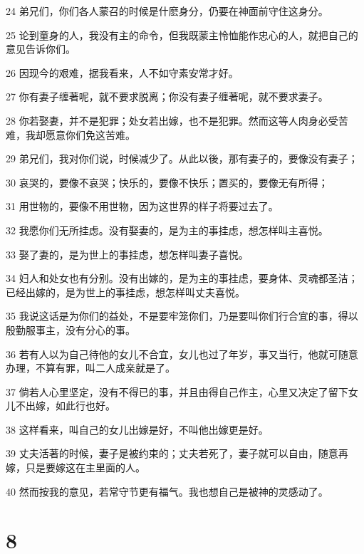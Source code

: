 \par 24 弟兄们，你们各人蒙召的时候是什麽身分，仍要在神面前守住这身分。
\par 25 论到童身的人，我没有主的命令，但我既蒙主怜恤能作忠心的人，就把自己的意见告诉你们。
\par 26 因现今的艰难，据我看来，人不如守素安常才好。
\par 27 你有妻子缠著呢，就不要求脱离；你没有妻子缠著呢，就不要求妻子。
\par 28 你若娶妻，并不是犯罪；处女若出嫁，也不是犯罪。然而这等人肉身必受苦难，我却愿意你们免这苦难。
\par 29 弟兄们，我对你们说，时候减少了。从此以後，那有妻子的，要像没有妻子；
\par 30 哀哭的，要像不哀哭；快乐的，要像不快乐；置买的，要像无有所得；
\par 31 用世物的，要像不用世物，因为这世界的样子将要过去了。
\par 32 我愿你们无所挂虑。没有娶妻的，是为主的事挂虑，想怎样叫主喜悦。
\par 33 娶了妻的，是为世上的事挂虑，想怎样叫妻子喜悦。
\par 34 妇人和处女也有分别。没有出嫁的，是为主的事挂虑，要身体、灵魂都圣洁；已经出嫁的，是为世上的事挂虑，想怎样叫丈夫喜悦。
\par 35 我说这话是为你们的益处，不是要牢笼你们，乃是要叫你们行合宜的事，得以殷勤服事主，没有分心的事。
\par 36 若有人以为自己待他的女儿不合宜，女儿也过了年岁，事又当行，他就可随意办理，不算有罪，叫二人成亲就是了。
\par 37 倘若人心里坚定，没有不得已的事，并且由得自己作主，心里又决定了留下女儿不出嫁，如此行也好。
\par 38 这样看来，叫自己的女儿出嫁是好，不叫他出嫁更是好。
\par 39 丈夫活著的时候，妻子是被约束的；丈夫若死了，妻子就可以自由，随意再嫁，只是要嫁这在主里面的人。
\par 40 然而按我的意见，若常守节更有福气。我也想自己是被神的灵感动了。

\chapter{8}

